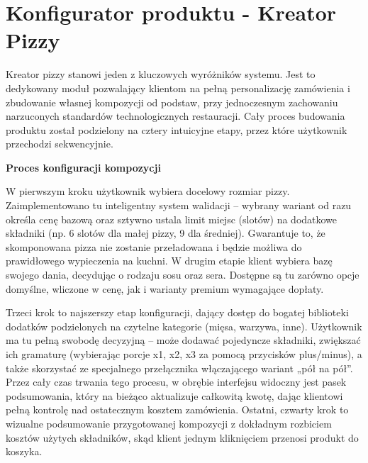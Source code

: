 \section{Konfigurator produktu - Kreator Pizzy}

Kreator pizzy stanowi jeden z kluczowych wyróżników systemu. Jest to dedykowany moduł pozwalający klientom na pełną personalizację zamówienia i zbudowanie własnej kompozycji od podstaw, przy jednoczesnym zachowaniu narzuconych standardów technologicznych restauracji. Cały proces budowania produktu został podzielony na cztery intuicyjne etapy, przez które użytkownik przechodzi sekwencyjnie.

\vspace{10pt}
\textbf{Proces konfiguracji kompozycji}
\vspace{5pt}

W pierwszym kroku użytkownik wybiera docelowy rozmiar pizzy. Zaimplementowano tu inteligentny system walidacji – wybrany wariant od razu określa cenę bazową oraz sztywno ustala limit miejsc (slotów) na dodatkowe składniki (np. 6 slotów dla małej pizzy, 9 dla średniej). Gwarantuje to, że skomponowana pizza nie zostanie przeładowana i będzie możliwa do prawidłowego wypieczenia na kuchni. W drugim etapie klient wybiera bazę swojego dania, decydując o rodzaju sosu oraz sera. Dostępne są tu zarówno opcje domyślne, wliczone w cenę, jak i warianty premium wymagające dopłaty.

\vspace{5pt}

Trzeci krok to najszerszy etap konfiguracji, dający dostęp do bogatej biblioteki dodatków podzielonych na czytelne kategorie (mięsa, warzywa, inne). Użytkownik ma tu pełną swobodę decyzyjną – może dodawać pojedyncze składniki, zwiększać ich gramaturę (wybierając porcje x1, x2, x3 za pomocą przycisków plus/minus), a także skorzystać ze specjalnego przełącznika włączającego wariant „pół na pół”. Przez cały czas trwania tego procesu, w obrębie interfejsu widoczny jest pasek podsumowania, który na bieżąco aktualizuje całkowitą kwotę, dając klientowi pełną kontrolę nad ostatecznym kosztem zamówienia. Ostatni, czwarty krok to wizualne podsumowanie przygotowanej kompozycji z dokładnym rozbiciem kosztów użytych składników, skąd klient jednym kliknięciem przenosi produkt do koszyka.

